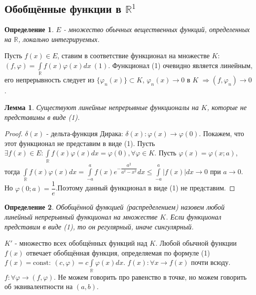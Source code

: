 \documentclass[9pt, a4paper]{article}
\newtheorem*{lemma}{Лемма}
\newtheorem*{definition}{Определение}
\begin{document}
		\subsection*{Обобщённые функции в $\mathbb{R}^1$}
			\begin{definition}
				$E$ - множество обычных вещественных функций, определенных на $\mathbb{R}$, локально интегрируемых.
			\end{definition}
			Пусть $f(x) \in E$, ставим в соответствие функционал на множестве $K$: $(f, \varphi) = \int\limits_{\mathbb{R}} f(x) \varphi(x) dx \ (1)$.\newline
			Функционал (1) очевидно является линейным, его непрерывность следует из $\{\varphi_n(x)\} \subset K$, $\varphi_n(x) \to 0$ в $K$ $\Rightarrow (f, \varphi_n) \to 0$. 
			\begin{lemma}
				Существуют линейные непрерывные функционалы на $K$, которые не представимы в виде (1).
			\end{lemma}
			\begin{proof}
				$\delta(x)$ - дельта-функция Дирака: $\delta(x): \varphi(x) \to \varphi(0)$. Покажем, что этот функционал не представим в виде (1). Пусть $\exists f(x) \in E: \int\limits_{\mathbb{R}} f(x)\varphi(x) dx = \varphi(0), \forall \varphi \in K$. Пусть $\varphi(x) = \varphi(x; a)$, тогда $\int\limits_{\mathbb{R}} f(x) \varphi(x) dx = \int\limits_{-a}^{a} f(x) e^{-\dfrac{a^2}{a^2 - x^2}} dx \leq \int\limits_{-a}^{a} |f(x)| dx \to 0 $ при $a \to 0$. Но $\varphi(0; a) = \dfrac{1}{e}$.Поэтому данный функционал в виде (1) не представим.
			\end{proof}
			\begin{definition}
				Обобщённой функцией (распределением) назовем любой линейный непрерывный функционал на множестве $K$. Если функционал представим в виде (1), то он регулярный, иначе сингулярный.
			\end{definition}
			$K'$ - множество всех обобщённых функций над $K$. \newline
			Любой обычной функции $f(x)$ отвечает обобщённая функция, определяемая по формуле (1) $f(x) = \mathrm{const}: \ (c,\varphi) = c \int\limits_{\mathbb{R}} \varphi(x) dx$. $f(x): \forall x \to f(x)$ почти всюду. $f: \forall \varphi \to (f, \varphi)$. Не можем говорить про равенство в точке, но можем говорить об эквивалентности на $(a,b)$.
\end{document}

